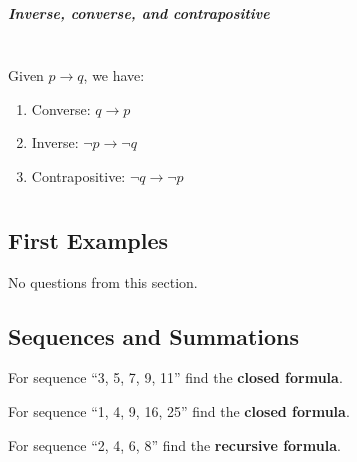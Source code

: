     \paragraph{Inverse, converse, and contrapositive} ~\\

        Given $p \to q$, we have:

        \begin{enumerate}
            \item   Converse:       $q \to p$
            \item   Inverse:        $\neg p \to \neg q$
            \item   Contrapositive: $\neg q \to \neg p$
        \end{enumerate}
        
        
        

    \chapter*{\laTitle}

    \section{First Examples}

        No questions from this section. 
    
    \section{Sequences and Summations}

        \begin{questionNOGRADE}{\thequestion}
            For sequence ``3, 5, 7, 9, 11'' find the \textbf{closed formula}.
        \end{questionNOGRADE}

        \begin{questionNOGRADE}{\thequestion}
            For sequence ``1, 4, 9, 16, 25'' find the \textbf{closed formula}.
        \end{questionNOGRADE}

        \begin{questionNOGRADE}{\thequestion}
            For sequence ``2, 4, 6, 8'' find the \textbf{recursive formula}.
        \end{questionNOGRADE}


